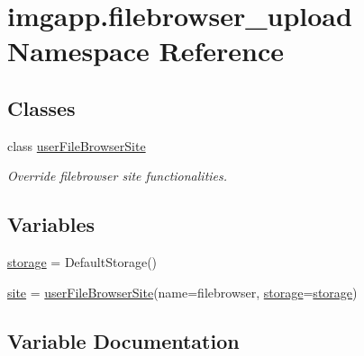 \hypertarget{namespaceimgapp_1_1filebrowser__upload}{}\section{imgapp.\+filebrowser\+\_\+upload Namespace Reference}
\label{namespaceimgapp_1_1filebrowser__upload}
\subsection*{Classes}
\begin{DoxyCompactItemize}
\item 
class \hyperlink{classimgapp_1_1filebrowser__upload_1_1userFileBrowserSite}{user\+File\+Browser\+Site}
\begin{DoxyCompactList}\small\item\em Override filebrowser site functionalities. \end{DoxyCompactList}\end{DoxyCompactItemize}
\subsection*{Variables}
\begin{DoxyCompactItemize}
\item 
\hyperlink{namespaceimgapp_1_1filebrowser__upload_ae26049c70fbfba51dec84d62840e6a01}{storage} = Default\+Storage()
\item 
\hyperlink{namespaceimgapp_1_1filebrowser__upload_a4f8619d5576e067e06247f18cd273af8}{site} = \hyperlink{classimgapp_1_1filebrowser__upload_1_1userFileBrowserSite}{user\+File\+Browser\+Site}(name=\textquotesingle{}filebrowser\textquotesingle{}, \hyperlink{namespaceimgapp_1_1filebrowser__upload_ae26049c70fbfba51dec84d62840e6a01}{storage}=\hyperlink{namespaceimgapp_1_1filebrowser__upload_ae26049c70fbfba51dec84d62840e6a01}{storage})
\end{DoxyCompactItemize}


\subsection{Variable Documentation}
\mbox{\label{namespaceimgapp_1_1filebrowser__upload_a4f8619d5576e067e06247f18cd273af8}} 
